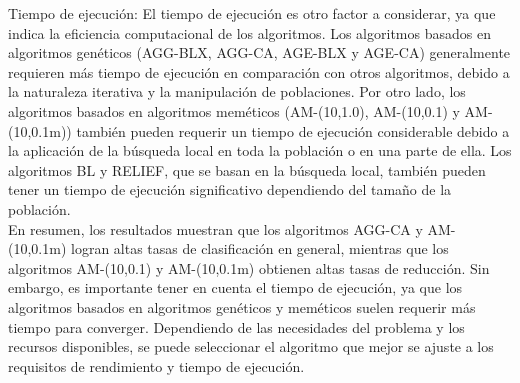 Tiempo de ejecución: El tiempo de ejecución es otro factor a considerar, ya que indica la eficiencia computacional de los algoritmos. Los algoritmos basados en algoritmos genéticos (AGG-BLX, AGG-CA, AGE-BLX y AGE-CA) generalmente requieren más tiempo de ejecución en comparación con otros algoritmos, debido a la naturaleza iterativa y la manipulación de poblaciones. Por otro lado, los algoritmos basados en algoritmos meméticos (AM-(10,1.0), AM-(10,0.1) y AM-(10,0.1m)) también pueden requerir un tiempo de ejecución considerable debido a la aplicación de la búsqueda local en toda la población o en una parte de ella. Los algoritmos BL y RELIEF, que se basan en la búsqueda local, también pueden tener un tiempo de ejecución significativo dependiendo del tamaño de la población.\\

En resumen, los resultados muestran que los algoritmos AGG-CA y AM-(10,0.1m) logran altas tasas de clasificación en general, mientras que los algoritmos AM-(10,0.1) y AM-(10,0.1m) obtienen altas tasas de reducción. Sin embargo, es importante tener en cuenta el tiempo de ejecución, ya que los algoritmos basados en algoritmos genéticos y meméticos suelen requerir más tiempo para converger. Dependiendo de las necesidades del problema y los recursos disponibles, se puede seleccionar el algoritmo que mejor se ajuste a los requisitos de rendimiento y tiempo de ejecución.



